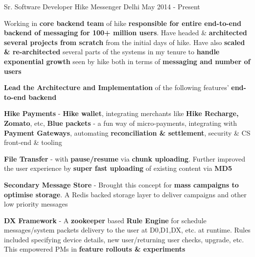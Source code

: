 
\begin{cventries}
  \cventry
    {Sr. Software Developer} %
    {Hike Messenger} %
    {Delhi} %
    {May 2014 - Present} %
    {
     \vspace{3pt}
      \begin{cvitems} %
        \item {Working in \textbf{core backend team} of hike \textbf{responsible for entire end-to-end backend of messaging} \textbf{for 100+ million users}. Have headed \& \textbf{architected several projects from scratch} from the initial days of hike. Have also \textbf{scaled \& re-architected} several parts of the systems in my tenure to \textbf{handle exponential growth} seen by hike both in terms of \textbf{messaging and number of users}}
		\item {\textbf{Lead the Architecture and Implementation} of the following features' \textbf{end-to-end backend}}
        \begin{cventries}
          \cventry
            {} %
            {} %
            {} %
            {} %
            {
             \vspace{-20pt}
              \begin{cvsubitems}
                \item {\textbf{Hike Payments} - \textbf{Hike wallet}, integrating merchants like \textbf{Hike Recharge, Zomato}, etc, \textbf{Blue packets} - a fun way of micro-payments, integrating with \textbf{Payment Gateways}, automating \textbf{reconciliation \& settlement}, security \& CS front-end \& tooling}
                \item {\textbf{File Transfer} - with \textbf{pause/resume} via \textbf{chunk uploading}. Further improved the user experience by \textbf{super fast uploading} of existing content via \textbf{MD5}}
		        \item {\textbf{Secondary Message Store} - Brought this concept for \textbf{mass campaigns to optimise storage}. A Redis backed storage layer to deliver campaigns and other low priority messages}
		        \item {\textbf{DX Framework} - A \textbf{zookeeper} based \textbf{Rule Engine} for schedule messages/system packets delivery to the user at D0,D1,DX, etc. at runtime. Rules included specifying device details, new user/returning user checks, upgrade, etc. This empowered PMs in \textbf{feature rollouts \& experiments}}

\end{cvsubitems}}
\end{cventries}
\end{cvitems}}
\end{cventries}
